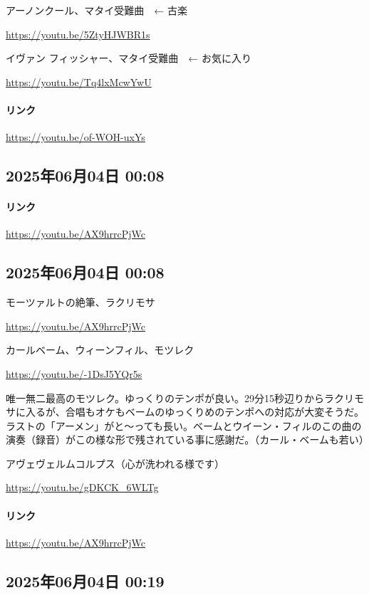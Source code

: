 アーノンクール、マタイ受難曲　← 古楽

\url{https://youtu.be/5ZtyHJWBR1s}

イヴァン フィッシャー、マタイ受難曲　← お気に入り

\url{https://youtu.be/Tq4lxMcwYwU}

\paragraph{リンク}
\url{https://youtu.be/of-WOH-uxYs}

\subsection*{2025年06月04日 00:08}

\paragraph{リンク}
\url{https://youtu.be/AX9hrrcPjWc}

\subsection*{2025年06月04日 00:08}

モーツァルトの絶筆、ラクリモサ

\url{https://youtu.be/AX9hrrcPjWc}

カールベーム、ウィーンフィル、モツレク

\url{https://youtu.be/-1DsJ5YQr5s}

唯一無二最高のモツレク。ゆっくりのテンポが良い。29分15秒辺りからラクリモサに入るが、合唱もオケもベームのゆっくりめのテンポへの対応が大変そうだ。ラストの「アーメン」がと〜っても長い。ベームとウイーン・フィルのこの曲の演奏（録音）がこの様な形で残されている事に感謝だ。（カール・ベームも若い）

アヴェヴェルムコルプス（心が洗われる様です）

\url{https://youtu.be/gDKCK_6WLTg}

\paragraph{リンク}
\url{https://youtu.be/AX9hrrcPjWc}

\subsection*{2025年06月04日 00:19}

